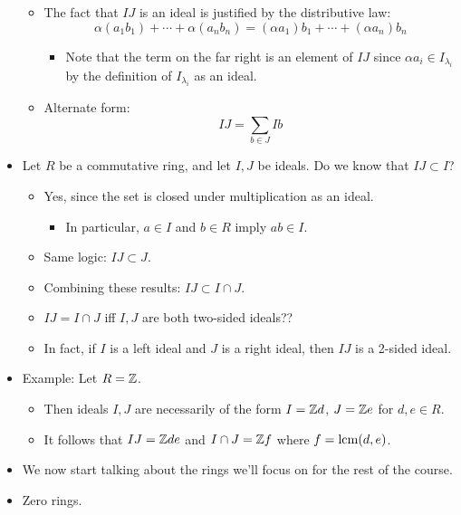 \documentclass[../notes.tex]{subfiles}
\begin{document}
\begin{itemize}
\begin{itemize}
        \item The fact that $IJ$ is an ideal is justified by the distributive law:
        \begin{equation*}
            \alpha(a_1b_1)+\cdots+\alpha(a_nb_n) = (\alpha a_1)b_1+\cdots+(\alpha a_n)b_n
        \end{equation*}
        \begin{itemize}
            \item Note that the term on the far right is an element of $IJ$ since $\alpha a_i\in I_{\lambda_i}$ by the definition of $I_{\lambda_i}$ as an ideal.
        \end{itemize}
        \item Alternate form:
        \begin{equation*}
            IJ = \sum_{b\in J}Ib
        \end{equation*}
    \end{itemize}
    \item Let $R$ be a commutative ring, and let $I,J$ be ideals. Do we know that $IJ\subset I$?
    \begin{itemize}
        \item Yes, since the set is closed under multiplication as an ideal.
        \begin{itemize}
            \item In particular, $a\in I$ and $b\in R$ imply $ab\in I$.
        \end{itemize}
        \item Same logic: $IJ\subset J$.
        \item Combining these results: $IJ\subset I\cap J$.
        \item $IJ=I\cap J$ iff $I,J$ are both two-sided ideals??
        \item In fact, if $I$ is a left ideal and $J$ is a right ideal, then $IJ$ is a 2-sided ideal.
    \end{itemize}
    \item Example: Let $R=\mathbb{Z}$.
    \begin{itemize}
        \item Then ideals $I,J$ are necessarily of the form $I=\mathbb{Z} d$, $J=\mathbb{Z} e$ for $d,e\in R$.
        \item It follows that $IJ=\mathbb{Z} de$ and $I\cap J=\mathbb{Z} f$ where $f=\operatorname{lcm}(d,e)$.
    \end{itemize}
    \item We now start talking about the rings we'll focus on for the rest of the course.
    \item Zero rings.

\end{itemize}
\end{document}
